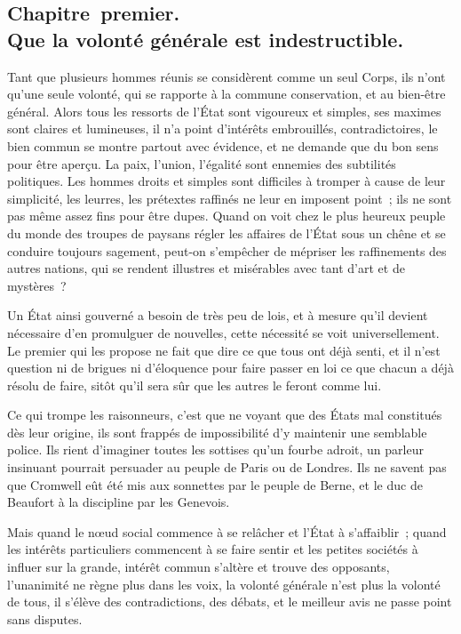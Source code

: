 \documentclass[french,twoside]{book} %
\begin{document}
\subsection[{Chapitre premier. Que la volonté générale est indestructible.}]{Chapitre premier. \\
Que la volonté générale est indestructible.}
\noindent Tant que plusieurs hommes réunis se considèrent comme un seul Corps, ils n’ont qu’une seule volonté, qui se rapporte à la commune conservation, et au bien-être général. Alors tous les ressorts de l’État sont vigoureux et simples, ses maximes sont claires et lumineuses, il n’a point d’intérêts embrouillés, contradictoires, le bien commun se montre partout avec évidence, et ne demande que du bon sens pour être aperçu. La paix, l’union, l’égalité sont ennemies des subtilités politiques. Les hommes droits et simples sont difficiles à tromper à cause de leur simplicité, les leurres, les prétextes raffinés ne leur en imposent point ; ils ne sont pas même assez fins pour être dupes. Quand on voit chez le plus heureux peuple du monde des troupes de paysans régler les affaires de l’État sous un chêne et se conduire toujours sagement, peut-on s’empêcher de mépriser les raffinements des autres nations, qui se rendent illustres et misérables avec tant d’art et de mystères ?\par
Un État ainsi gouverné a besoin de très peu de lois, et à mesure qu’il devient nécessaire d’en promulguer de nouvelles, cette nécessité se voit universellement. Le premier qui les propose ne fait que dire ce que tous ont déjà senti, et il n’est question ni de brigues ni d’éloquence pour faire passer en loi ce que chacun a déjà résolu de faire, sitôt qu’il sera sûr que les autres le feront comme lui.\par
Ce qui trompe les raisonneurs, c’est que ne voyant que des États mal constitués dès leur origine, ils sont frappés de impossibilité d’y maintenir une semblable police. Ils rient d’imaginer toutes les sottises qu’un fourbe adroit, un parleur insinuant pourrait persuader au peuple de Paris ou de Londres. Ils ne savent pas que Cromwell eût été mis aux sonnettes par le peuple de Berne, et le duc de Beaufort à la discipline par les Genevois.\par
Mais quand le nœud social commence à se relâcher et l’État à s’affaiblir ; quand les intérêts particuliers commencent à se faire sentir et les petites sociétés à influer sur la grande, intérêt commun s’altère et trouve des opposants, l’unanimité ne règne plus dans les voix, la volonté générale n’est plus la volonté de tous, il s’élève des contradictions, des débats, et le meilleur avis ne passe point sans disputes.\par
\end{document}
